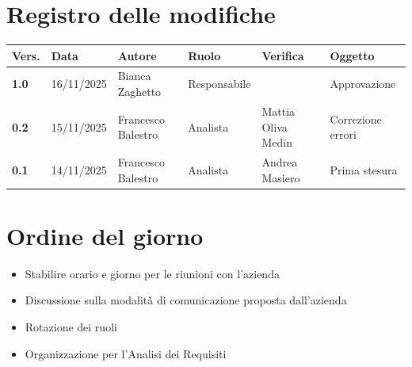 \documentclass[a4paper,12pt]{article}
\begin{document}
    

    \newpage
    \section*{Registro delle modifiche}

    \begin{table}[h!]
        \begin{tabularx}{\textwidth}{|l|l|l|l|X|X|}
            \hline
            \textbf{Vers.} & \textbf{Data} & \textbf{Autore} & \textbf{Ruolo} & \textbf{Verifica} & \textbf{Oggetto} \\
            \hline
            \textbf{1.0} & 16/11/2025 & Bianca Zaghetto & Responsabile &  & Approvazione \\
            \hline
            \textbf{0.2} & 15/11/2025 & Francesco Balestro & Analista & Mattia Oliva Medin & Correzione errori \\
            \hline
            \textbf{0.1} & 14/11/2025 & Francesco Balestro & Analista & Andrea Masiero & Prima stesura \\
        \hline
        \end{tabularx}
    \end{table}

    \newpage
    \tableofcontents
    \newpage

    \section{Ordine del giorno} {
        \begin{itemize}
            \item Stabilire orario e giorno per le riunioni con l'azienda
            \item Discussione sulla modalità di comunicazione proposta dall'azienda
            \item Rotazione dei ruoli
            \item Organizzazione per l'Analisi dei Requisiti
        \end{itemize}
    }
\end{document}

